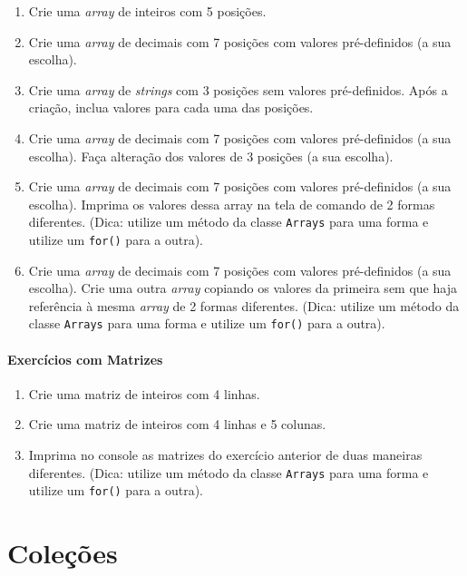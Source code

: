 \documentclass[
]{book}
\providecommand{\tightlist}{%
  \setlength{\itemsep}{0pt}\setlength{\parskip}{0pt}}
\begin{document}
\begin{enumerate}
\def\labelenumi{\arabic{enumi}.}
\tightlist
\item
  Crie uma \emph{array} de inteiros com 5 posições.
\item
  Crie uma \emph{array} de decimais com 7 posições com valores pré-definidos (a sua escolha).
\item
  Crie uma \emph{array} de \emph{strings} com 3 posições sem valores pré-definidos. Após a criação, inclua valores para cada uma das posições.
\item
  Crie uma \emph{array} de decimais com 7 posições com valores pré-definidos (a sua escolha). Faça alteração dos valores de 3 posições (a sua escolha).
\item
  Crie uma \emph{array} de decimais com 7 posições com valores pré-definidos (a sua escolha). Imprima os valores dessa array na tela de comando de 2 formas diferentes. (Dica: utilize um método da classe \texttt{Arrays} para uma forma e utilize um \texttt{for()} para a outra).
\item
  Crie uma \emph{array} de decimais com 7 posições com valores pré-definidos (a sua escolha). Crie uma outra \emph{array} copiando os valores da primeira sem que haja referência à mesma \emph{array} de 2 formas diferentes. (Dica: utilize um método da classe \texttt{Arrays} para uma forma e utilize um \texttt{for()} para a outra).
\end{enumerate}

\hypertarget{exercuxedcios-com-matrizes}{%
\subsubsection*{Exercícios com Matrizes}\label{exercuxedcios-com-matrizes}}

\begin{enumerate}
\def\labelenumi{\arabic{enumi}.}
\tightlist
\item
  Crie uma matriz de inteiros com 4 linhas.
\item
  Crie uma matriz de inteiros com 4 linhas e 5 colunas.
\item
  Imprima no console as matrizes do exercício anterior de duas maneiras diferentes. (Dica: utilize um método da classe \texttt{Arrays} para uma forma e utilize um \texttt{for()} para a outra).
\end{enumerate}

\hypertarget{coleuxe7uxf5es}{%
\chapter{Coleções}\label{coleuxe7uxf5es}}
\end{document}
